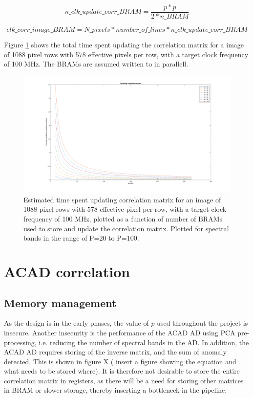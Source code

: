 \begin{equation}
    n\_clk\_update\_corr\_BRAM = \frac{p * p }{2 * n\_BRAM}
    \label{eq:clk_cycles_corr_update_BRAM}
\end{equation}

\begin{equation}
    clk\_corr\_image\_BRAM = N\_pixels *number\_of\_lines * n\_clk\_update\_corr\_BRAM
    \label{eq:clk_cycles_corr_image}
\end{equation}


Figure \ref{fig:update_time_correlation_BRAM} shows the total time spent updating the correlation matrix for a image of 1088 pixel rows with 578 effective pixels per row, with a target clock frequency of 100 MHz. The BRAMs are assumed written to in parallell.  

\begin{figure}[H]
\centering
   \includegraphics[scale=0.3]{images/time_spent_updating_correlation_matrix.png}
  \caption{Estimated time spent updating correlation matrix for an image of 1088 pixel rows with 578 effective pixel per row, with a target clock frequency of 100 MHz, plotted as a function of number of BRAMs used to store and update the correlation matrix. Plotted for spectral bands in the range of P=20 to P=100. } 
  \label{fig:update_time_correlation_BRAM}
\end{figure}

\section{ACAD correlation}
\label{sec:correlation_hw}
\subsection{Memory management}
As the design is in the early phases, the value of $p$ used throughout the project is insecure. Another insecurity is the performance of the ACAD AD using PCA pre-processing, i.e. reducing the number of spectral bands in the AD. In addition, the ACAD AD requires storing of the inverse matrix, and the sum of anomaly detected. This is shown in figure X ( insert a figure showing the equation and what needs to be stored where). It is therefore not desirable to store the entire correlation matrix in registers, as there will be a need for storing other matrices in BRAM or slower storage, thereby inserting a bottleneck in the pipeline.
\\

